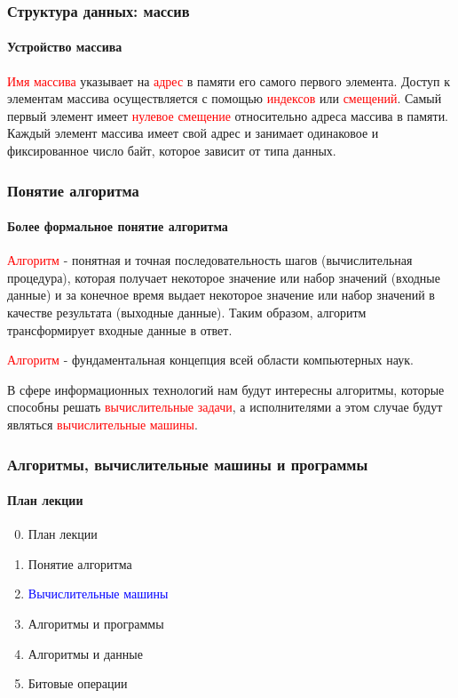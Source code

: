 \documentclass[aspectratio=169]{beamer}
\begin{document}
\begin{frame}
\frametitle{Структура данных: массив}
\framesubtitle{Устройство массива}
\justifying
\textcolor{red}{Имя массива} указывает на \textcolor{red}{адрес} в памяти его самого первого элемента. \newline\newline Доступ к элементам массива осуществляется с помощью \textcolor{red}{индексов} или \textcolor{red}{смещений}. \newline\newline
Самый первый элемент имеет \textcolor{red}{нулевое смещение} относительно адреса массива в памяти.\newline\newline
Каждый элемент массива имеет свой адрес и занимает одинаковое и фиксированное число байт, которое зависит от типа данных.
\end{frame}


\begin{frame}
\frametitle{Понятие алгоритма}
\framesubtitle{Более формальное понятие алгоритма}
\justifying
\textcolor{red} {Алгоритм} - понятная и точная последовательность шагов (вычислительная процедура), которая получает некоторое значение или набор значений (входные данные) и за конечное время выдает некоторое значение или набор значений в качестве результата (выходные данные). \newline\newline
Таким образом, алгоритм трансформирует входные данные в ответ.\newline

\textcolor{red} {Алгоритм} - фундаментальная концепция всей области компьютерных наук.\newline

В сфере информационных технологий нам будут интересны алгоритмы, которые способны решать \textcolor{red}{вычислительные задачи}, а исполнителями а этом случае будут являться \textcolor{red}{вычислительные машины}.

\end{frame}

\begin{frame}
\frametitle{Алгоритмы, вычислительные машины и программы}
\framesubtitle{План лекции}

\begin{enumerate}
  \setcounter{enumi}{-1}
  \item{План лекции}
  \item{Понятие алгоритма}
  \item{\textcolor{blue}{Вычислительные машины}}
  \item{Алгоритмы и программы}
  \item{Алгоритмы и данные}
  \item{Битовые операции}

\end{enumerate}
\end{frame}
\end{document}
